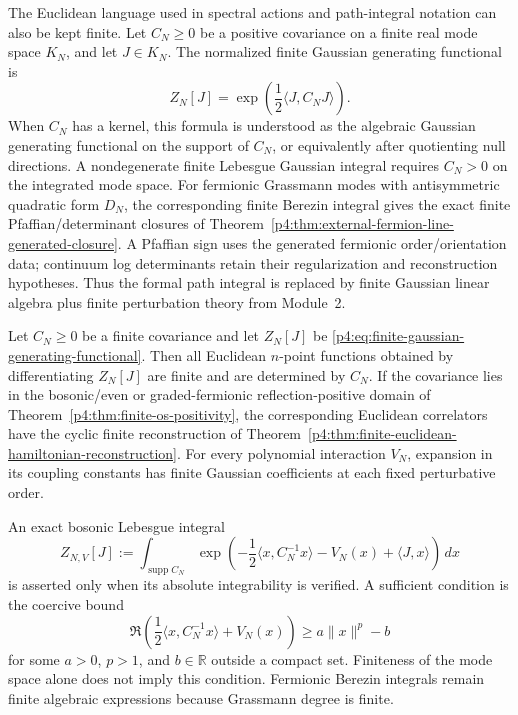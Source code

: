 \documentclass[12pt,a4paper]{article}
\begin{document}
The Euclidean language used in spectral actions and path-integral notation can also be kept finite.  Let \(C_N\ge0\) be a positive covariance on a finite real mode space \(K_N\), and let \(J\in K_N\).  The normalized finite Gaussian generating functional is
\begin{equation}
\label{p4:eq:finite-gaussian-generating-functional}
Z_N[J]
=
\exp\!\left(\frac12\langle J,C_NJ\rangle\right).
\end{equation}
When \(C_N\) has a kernel, this formula is understood as the algebraic Gaussian generating functional on the support of \(C_N\), or equivalently after quotienting null directions. A nondegenerate finite Lebesgue Gaussian integral requires \(C_N>0\) on the integrated mode space.
For fermionic Grassmann modes with antisymmetric quadratic form \(D_N\), the
corresponding finite Berezin integral gives the exact finite
Pfaffian/determinant closures of
Theorem~\ref{p4:thm:external-fermion-line-generated-closure}.  A Pfaffian
sign uses the generated fermionic order/orientation data; continuum log
determinants retain their regularization and reconstruction hypotheses.  Thus
the formal path integral is replaced by finite Gaussian linear algebra plus
finite perturbation theory from Module~2.


\begin{theorem}
\label{p4:thm:finite-euclidean-path-integral-status}
Let \(C_N\ge0\) be a finite covariance and let \(Z_N[J]\) be
\eqref{p4:eq:finite-gaussian-generating-functional}.  Then all Euclidean
\(n\)-point functions obtained by differentiating \(Z_N[J]\) are finite and
are determined by \(C_N\).  If the covariance lies in the bosonic/even or
graded-fermionic reflection-positive domain of
Theorem~\ref{p4:thm:finite-os-positivity}, the corresponding Euclidean
correlators have the cyclic finite reconstruction of
Theorem~\ref{p4:thm:finite-euclidean-hamiltonian-reconstruction}.
For every polynomial interaction \(V_N\), expansion in its coupling constants
has finite Gaussian coefficients at each fixed perturbative order.

An exact bosonic Lebesgue integral
\[
Z_{N,V}[J]
:=
\int_{\operatorname{supp}C_N}
\exp\!\left(
-\frac12\langle x,C_N^{-1}x\rangle
-V_N(x)+\langle J,x\rangle
\right)\,dx
\]
is asserted only when its absolute integrability is verified.  A sufficient
condition is the coercive bound
\[
\Re\!\left(\frac12\langle x,C_N^{-1}x\rangle+V_N(x)\right)
\ge a\|x\|^p-b
\]
for some \(a>0\), \(p>1\), and \(b\in\mathbb R\) outside a compact set.
Finiteness of
the mode space alone does not imply this condition.  Fermionic Berezin
integrals remain finite algebraic expressions because Grassmann degree is
finite.
\end{theorem}
\end{document}
